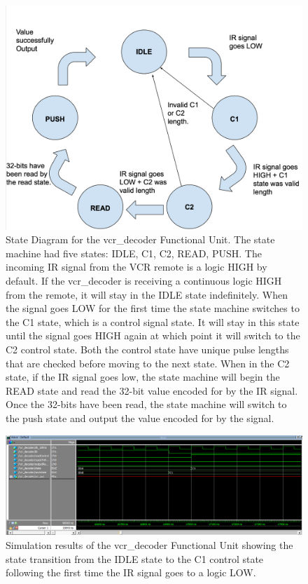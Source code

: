 \documentclass[a4paper]{article}
\begin{document}
\begin{figure}[h]
  \centering
    \includegraphics[width=.98\textwidth]{images/VCR_Decoder_state_diagram.png}
	\caption{State Diagram for the vcr\_decoder Functional Unit. The state machine had five states: IDLE, C1, C2, READ, PUSH. The incoming IR signal from the VCR remote is a logic HIGH by default. If the vcr\_decoder is receiving a continuous logic HIGH from the remote, it will stay in the IDLE state indefinitely. When the signal goes LOW for the first time the state machine switches to the C1 state, which is a control signal state. It will stay in this state until the signal goes HIGH again at which point it will switch to the C2 control state. Both the control state have unique pulse lengths that are checked before moving to the next state. When in the C2 state, if the IR signal goes low, the state machine will begin the READ state and read the 32-bit value encoded for by the IR signal. Once the 32-bits have been read, the state machine will switch to the push state and output the value encoded for by the signal.}
    \label{fig:top-level-sim}
\end{figure}
\begin{figure}[h]
  \centering
    \includegraphics[width=.98\textwidth]{sims/vcr_testing/moduleTests/vcr_decoder/IDLE_to_C1_Transition.png}
	\caption{Simulation results of the vcr\_decoder Functional Unit showing the state transition from the IDLE state to the C1 control state following the first time the IR signal goes to a logic LOW.}
    \label{fig:top-level-sim}
\end{figure}
\end{document}
